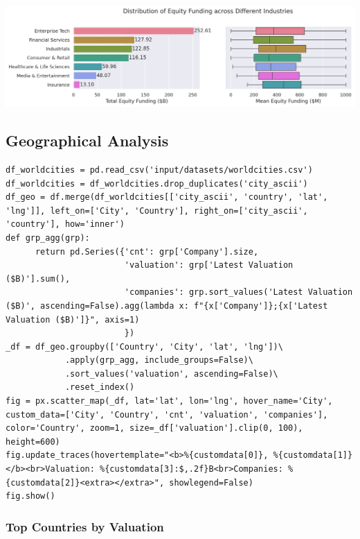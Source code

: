 \documentclass[a4paper,12pt]{article}
\begin{document}
\begin{center}
\includegraphics[width=.9\linewidth]{./.ob-jupyter/215e6c23cbc5b3bf332aa16d0f2fb53af47c666f.png}
\label{}
\end{center}
\subsection{Geographical Analysis}
\label{sec:org60b6245}

\begin{verbatim}
df_worldcities = pd.read_csv('input/datasets/worldcities.csv')
df_worldcities = df_worldcities.drop_duplicates('city_ascii')
df_geo = df.merge(df_worldcities[['city_ascii', 'country', 'lat', 'lng']], left_on=['City', 'Country'], right_on=['city_ascii', 'country'], how='inner')
def grp_agg(grp):
      return pd.Series({'cnt': grp['Company'].size,
                        'valuation': grp['Latest Valuation ($B)'].sum(),
                        'companies': grp.sort_values('Latest Valuation ($B)', ascending=False).agg(lambda x: f"{x['Company']};{x['Latest Valuation ($B)']}", axis=1)
                        })
_df = df_geo.groupby(['Country', 'City', 'lat', 'lng'])\
            .apply(grp_agg, include_groups=False)\
            .sort_values('valuation', ascending=False)\
            .reset_index()
fig = px.scatter_map(_df, lat='lat', lon='lng', hover_name='City', custom_data=['City', 'Country', 'cnt', 'valuation', 'companies'], color='Country', zoom=1, size=_df['valuation'].clip(0, 100), height=600)
fig.update_traces(hovertemplate="<b>%{customdata[0]}, %{customdata[1]}</b><br>Valuation: %{customdata[3]:$,.2f}B<br>Companies: %{customdata[2]}<extra></extra>", showlegend=False)
fig.show()
\end{verbatim}
\subsubsection{Top Countries by Valuation}
\label{sec:org7ee1001}
\end{document}

